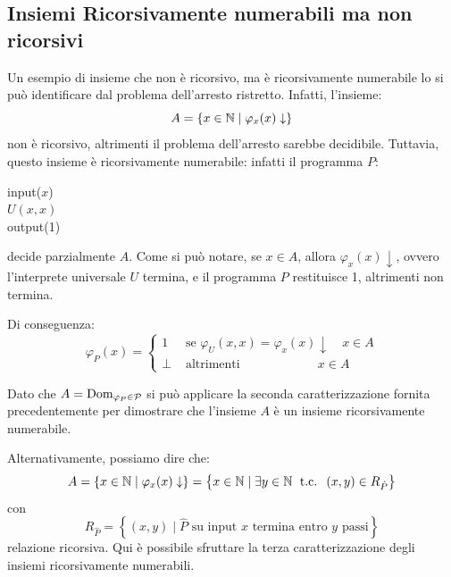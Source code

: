 \subsection{Insiemi Ricorsivamente numerabili ma non ricorsivi}

Un esempio di insieme che non è ricorsivo, ma è ricorsivamente numerabile lo si può identificare dal problema dell'arresto ristretto. Infatti, l'insieme:
$$ A = \{x \in \mathbb{N} \mid \varphi_x (x) \downarrow\}$$
non è ricorsivo, altrimenti il problema dell'arresto sarebbe decidibile. Tuttavia, questo insieme è ricorsivamente numerabile: infatti il programma $P$:

\begin{center}
	\vspace{1em}\hspace{5em}
	\begin{minipage}{.3\textwidth}
		\begin{tcolorbox}[
			colback=white,
			sharp corners,
			boxrule=.3mm,
			left=20pt,
			top=0pt,
			bottom=0pt,
			colbacktitle=white,
			coltitle=black
			]
			\begin{algorithm}[H]
				\SetAlgoNoEnd
				input($x$) \\
				$U(x,x)$ \\
				output(1)
			\end{algorithm}
		\end{tcolorbox}
	\end{minipage}
\end{center}
decide parzialmente $A$. Come si può notare, se $x \in A$, allora $\varphi_x (x) \downarrow$, ovvero l'interprete universale $U$ termina, e il programma $P$ restituisce 1, altrimenti non termina.

Di conseguenza:
$$
\varphi_P (x) = \begin{cases}
	1 & \text{ se } \varphi_U (x,x) = \varphi_x (x) \downarrow \quad x \in A \\
	\bot & \text{ altrimenti} \quad\quad\quad\quad\quad\quad \ x \in A
\end{cases}
$$

Dato che $A = \text{Dom}_{\varphi_P \in \mathcal{P}}$ si può applicare la seconda caratterizzazione fornita precedentemente per dimostrare che l'insieme $A$ è un insieme ricorsivamente numerabile.

Alternativamente, possiamo dire che:
$$ A = \left\{x \in \mathbb{N} \mid \varphi_x (x) \downarrow \right\} = \left\{x \in \mathbb{N} \mid \exists y \in \mathbb{N} \; \text{ t.c. } \; (x,y) \in R_{\hat{P}}\right\} $$
con
$$
R_{\hat{P}} = \left\{(x,y) \mid \hat{P} \text{ su input } x \text{ termina entro } y \text{ passi}\right\}
$$
relazione ricorsiva. Qui è possibile sfruttare la terza caratterizzazione degli insiemi ricorsivamente numerabili.

